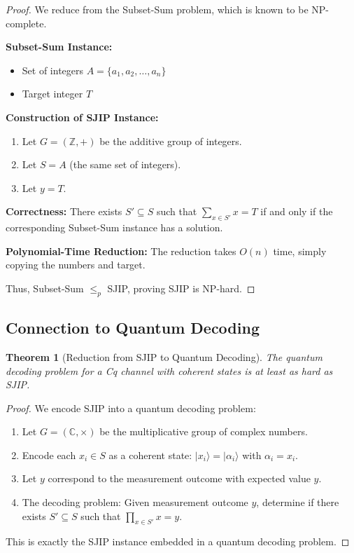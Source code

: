 \documentclass[12pt,a4paper]{article}
\newtheorem{theorem}{Theorem}[section]
\begin{document}
\begin{proof}
We reduce from the Subset-Sum problem, which is known to be NP-complete.

\noindent\textbf{Subset-Sum Instance:}
\begin{itemize}
\item Set of integers $A = \{a_1, a_2, \ldots, a_n\}$
\item Target integer $T$
\end{itemize}

\noindent\textbf{Construction of SJIP Instance:}
\begin{enumerate}
\item Let $G = (\mathbb{Z}, +)$ be the additive group of integers.
\item Let $S = A$ (the same set of integers).
\item Let $y = T$.
\end{enumerate}

\noindent\textbf{Correctness:}
There exists $S' \subseteq S$ such that $\sum_{x \in S'} x = T$ if and only if the corresponding Subset-Sum instance has a solution.

\noindent\textbf{Polynomial-Time Reduction:}
The reduction takes $O(n)$ time, simply copying the numbers and target.

Thus, Subset-Sum $\leq_p$ SJIP, proving SJIP is NP-hard.
\end{proof}

\subsection{Connection to Quantum Decoding}

\begin{theorem}[Reduction from SJIP to Quantum Decoding]
The quantum decoding problem for a Cq channel with coherent states is at least as hard as SJIP.
\end{theorem}

\begin{proof}
We encode SJIP into a quantum decoding problem:

\begin{enumerate}
\item Let $G = (\mathbb{C}, \times)$ be the multiplicative group of complex numbers.
\item Encode each $x_i \in S$ as a coherent state: $|x_i\rangle = |\alpha_i\rangle$ with $\alpha_i = x_i$.
\item Let $y$ correspond to the measurement outcome with expected value $y$.
\item The decoding problem: Given measurement outcome $y$, determine if there exists $S' \subseteq S$ such that $\prod_{x \in S'} x = y$.
\end{enumerate}

This is exactly the SJIP instance embedded in a quantum decoding problem.
\end{proof}
\end{document}
